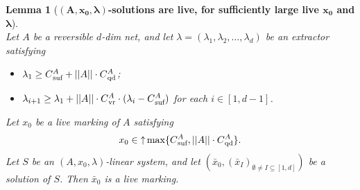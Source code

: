 \documentclass[11pt,a4paper]{amsart}
\newcommand{\nnorm}[1]{||#1||}
\newcommand{\vr}{{}_\textnormal{vr}}
\newcommand{\upC}[1]{\mathop{\uparrow}#1}
\newcommand{\suf}{{}_\textnormal{suf}}
\newcommand{\qd}{{}_\textnormal{qd}}
\theoremstyle{plain}
\newtheorem{lem}[thm]{Lemma}
\theoremstyle{definition}
\theoremstyle{defC}
\theoremstyle{thmC}
\begin{document}
\begin{lem}[\textbf{$\bm{(A,x_0,\lambda)}$-solutions are live, for
	sufficiently large live $\bm{x_0}$ 
	and $\bm{\lambda}$}]\label{lem:finalbasicnets}
\hfill\\
	Let $A$ be a reversible $d$-dim net, and let
	$\lambda=(\lambda_1,\lambda_2,\dots,\lambda_d)$ be an extractor
	satisfying
	\begin{itemize}
		\item
			$\lambda_1\geq
C\suf^A+\nnorm{A}\cdot C\qd^A$;
\item
	$\lambda_{i+1}\geq \lambda_1 + \nnorm{A}\cdot C\vr^A\cdot
			(\lambda_i-C\suf^A)$ for each
			$i\in[1,d{-}1]$.
	\end{itemize}
Let $x_0$ be a live marking of $A$ satisfying	
	\[x_0\in\upC{\max\{C\suf^A,\nnorm{A}\cdot
	C\qd^A\}}.\]
Let $S$ be an $(A,x_0,\lambda)$-linear system, and let
	$(\bar{x}_0,(\bar{x}_I)_{\emptyset\neq I\subseteq[1,d]})$ be a
	solution of $S$.  Then $\bar{x}_0$ is a live marking.
\end{lem}	
\end{document}
